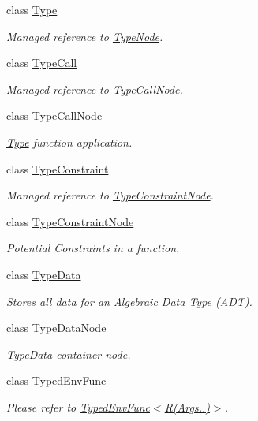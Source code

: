 \begin{DoxyCompactItemize}
class \hyperlink{classtvm_1_1Type}{Type}
\begin{DoxyCompactList}\small\item\em Managed reference to \hyperlink{classtvm_1_1TypeNode}{Type\+Node}. \end{DoxyCompactList}\item 
class \hyperlink{classtvm_1_1TypeCall}{Type\+Call}
\begin{DoxyCompactList}\small\item\em Managed reference to \hyperlink{classtvm_1_1TypeCallNode}{Type\+Call\+Node}. \end{DoxyCompactList}\item 
class \hyperlink{classtvm_1_1TypeCallNode}{Type\+Call\+Node}
\begin{DoxyCompactList}\small\item\em \hyperlink{classtvm_1_1Type}{Type} function application. \end{DoxyCompactList}\item 
class \hyperlink{classtvm_1_1TypeConstraint}{Type\+Constraint}
\begin{DoxyCompactList}\small\item\em Managed reference to \hyperlink{classtvm_1_1TypeConstraintNode}{Type\+Constraint\+Node}. \end{DoxyCompactList}\item 
class \hyperlink{classtvm_1_1TypeConstraintNode}{Type\+Constraint\+Node}
\begin{DoxyCompactList}\small\item\em Potential Constraints in a function. \end{DoxyCompactList}\item 
class \hyperlink{classtvm_1_1TypeData}{Type\+Data}
\begin{DoxyCompactList}\small\item\em Stores all data for an Algebraic Data \hyperlink{classtvm_1_1Type}{Type} (A\+DT). \end{DoxyCompactList}\item 
class \hyperlink{classtvm_1_1TypeDataNode}{Type\+Data\+Node}
\begin{DoxyCompactList}\small\item\em \hyperlink{classtvm_1_1TypeData}{Type\+Data} container node. \end{DoxyCompactList}\item 
class \hyperlink{classtvm_1_1TypedEnvFunc}{Typed\+Env\+Func}
\begin{DoxyCompactList}\small\item\em Please refer to \hyperlink{classtvm_1_1TypedEnvFunc_3_01R_07Args_8_8_8_08_4_TypedEnvFuncAnchor}{Typed\+Env\+Func$<$R(Args..)$>$}. \end{DoxyCompactList}\item 

\end{DoxyCompactItemize}
